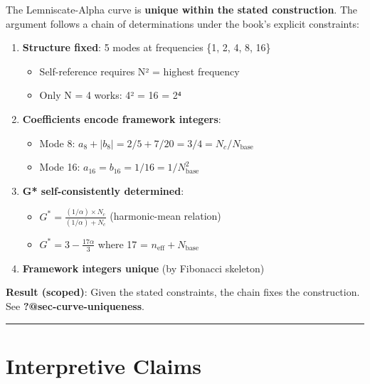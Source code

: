\documentclass[
  11pt,
  letterpaper,
  twoside,
  openright]{book}
\providecommand{\tightlist}{%
  \setlength{\itemsep}{0pt}\setlength{\parskip}{0pt}}
\begin{document}
The Lemniscate-Alpha curve is \textbf{unique within the stated
construction}. The argument follows a chain of determinations under the
book's explicit constraints:

\begin{enumerate}
\def\labelenumi{\arabic{enumi}.}
\tightlist
\item
  \textbf{Structure fixed}: 5 modes at frequencies \{1, 2, 4, 8, 16\}

  \begin{itemize}
  \tightlist
  \item
    Self-reference requires N² = highest frequency
  \item
    Only N = 4 works: 4² = 16 = 2⁴
  \end{itemize}
\item
  \textbf{Coefficients encode framework integers}:

  \begin{itemize}
  \tightlist
  \item
    Mode 8: \(a_8 + |b_8| = 2/5 + 7/20 = 3/4 = N_c/N_{\text{base}}\)
  \item
    Mode 16: \(a_{16} = b_{16} = 1/16 = 1/N_{\text{base}}^2\)
  \end{itemize}
\item
  \textbf{G* self-consistently determined}:

  \begin{itemize}
  \tightlist
  \item
    \(G^* = \frac{(1/\alpha) \times N_c}{(1/\alpha) + N_c}\)
    (harmonic-mean relation)
  \item
    \(G^* = 3 - \frac{17\alpha}{3}\) where 17 =
    \(n_{\text{eff}} + N_{\text{base}}\)
  \end{itemize}
\item
  \textbf{Framework integers unique} (by Fibonacci skeleton)
\end{enumerate}

\textbf{Result (scoped)}: Given the stated constraints, the chain fixes
the construction. See \textbf{?@sec-curve-uniqueness}.

\begin{center}\rule{0.5\linewidth}{0.5pt}\end{center}

\section{Interpretive Claims}\label{interpretive-claims}
\end{document}
